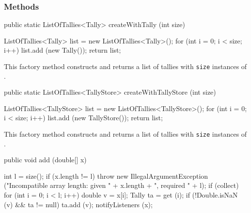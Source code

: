 \subsubsection*{Methods}
\begin{code}

   public static ListOfTallies<Tally> createWithTally (int size)\begin{hide} {
      ListOfTallies<Tally> list = new ListOfTallies<Tally>();
      for (int i = 0; i < size; i++)
         list.add (new Tally());
      return list;
   }\end{hide}
\end{code}
\begin{tabb}  This factory method constructs and returns a list of tallies with \texttt{size} instances of
   .
\end{tabb}
\begin{htmlonly}
\end{htmlonly}
\begin{code}

   public static ListOfTallies<TallyStore> createWithTallyStore (int size)\begin{hide} {
      ListOfTallies<TallyStore> list = new ListOfTallies<TallyStore>();
      for (int i = 0; i < size; i++)
         list.add (new TallyStore());
      return list;
   }\end{hide}
\end{code}
\begin{tabb}  This factory method constructs and returns a list of tallies with \texttt{size} instances of
   .
\end{tabb}
\begin{htmlonly}
\end{htmlonly}
\begin{code}

   public void add (double[] x)\begin{hide} {
      int l = size();
      if (x.length != l)
         throw new IllegalArgumentException
            ("Incompatible array length: given " +
            x.length + ", required " + l);
      if (collect)
         for (int i = 0; i < l; i++) {
            double v = x[i];
            Tally ta = get (i);
            if (!Double.isNaN (v) && ta != null)
               ta.add (v);
         }
         notifyListeners (x);
   }\end{hide}
\end{code}

